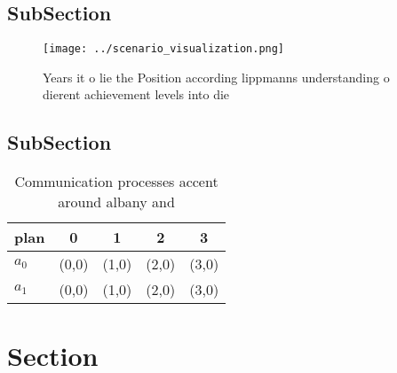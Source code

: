 \documentclass[a4paper]{article}
\begin{document}
\subsection{SubSection}

\begin{figure}
\centering
\texttt{[image: ../scenario\_visualization.png]}
\caption{Years it o lie the Position according lippmanns understanding o dierent achievement levels into die
}
\end{figure}
 
\subsection{SubSection}

\begin{table}
\begin{adjustbox}{width=0.7\columnwidth}
\begin{tabular}{|l|l|l|l|l|}
\hline
\textbf{plan} & \multicolumn{1}{c|}{\textbf{0}} & \multicolumn{1}{c|}{\textbf{1}} & \multicolumn{1}{c|}{\textbf{2}} & \multicolumn{1}{c|}{\textbf{3}} \\ \hline
\textbf{$a_0$}  & (0,0) & (1,0) & (2,0) & (3,0) \\ \hline
\textbf{$a_1$}  & (0,0) & (1,0) & (2,0) & (3,0) \\ \hline
\end{tabular}
\end{adjustbox}
\caption{Communication processes accent around albany and 
}
\end{table}

\section{Section}
\end{document}

